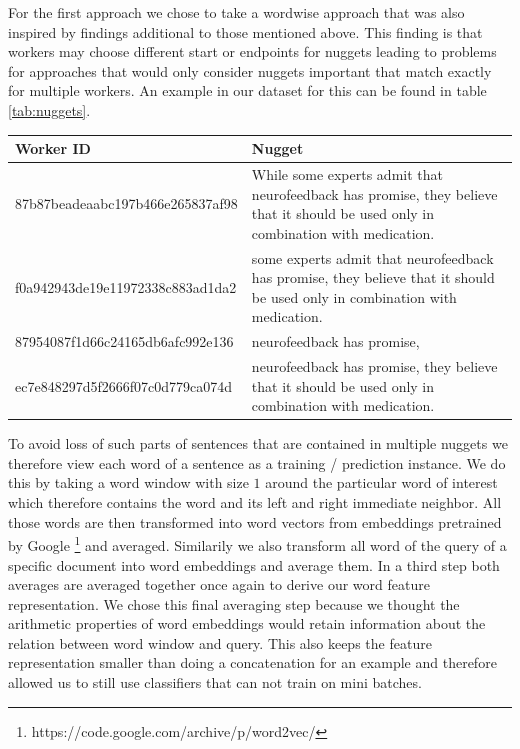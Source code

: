 \documentclass{article}
\begin{document}
For the first approach we chose to take a wordwise approach that was also inspired by findings additional to those mentioned above. This finding is that workers may choose different start or endpoints for nuggets leading to problems for approaches that would only consider nuggets important that match exactly for multiple workers. An example in our dataset for this can be found in table \ref{tab:nuggets}.
\begin{center}
	\begin{tabular}{ | l | p{7cm} |}
		\hline
		Worker ID & Nugget \\ \hline
		87b87beadeaabc197b466e265837af98 &  While some experts admit that neurofeedback has promise, they believe that it should be used only in combination with medication. \\ \hline
		f0a942943de19e11972338c883ad1da2 &  some experts admit that neurofeedback has promise, they believe that it should be used only in combination with medication. \\ \hline

		87954087f1d66c24165db6afc992e136 &  neurofeedback has promise, \\ \hline

		ec7e848297d5f2666f07c0d779ca074d	 &  neurofeedback has promise, they believe that it should be used only in combination with medication. \\
		\hline
	\end{tabular}
\label{tab:nuggets}
\end{center}
To avoid loss of such parts of sentences that are contained in multiple nuggets we therefore view each word of a sentence as a training / prediction instance. We do this by taking a word window with size $1$ around the particular word of interest which therefore contains the word and its left and right immediate neighbor. All those words are then transformed into word vectors from embeddings pretrained by Google \footnote{https://code.google.com/archive/p/word2vec/} and averaged. Similarily we also transform all word of the query of a specific document into word embeddings and average them. In a third step both averages are averaged together once again to derive our word feature representation. We chose this final averaging step because we thought the arithmetic properties of word embeddings would retain information about the relation between word window and query. This also keeps the feature representation smaller than doing a concatenation for an example and therefore allowed us to still use classifiers that can not train on mini batches.
\end{document}

